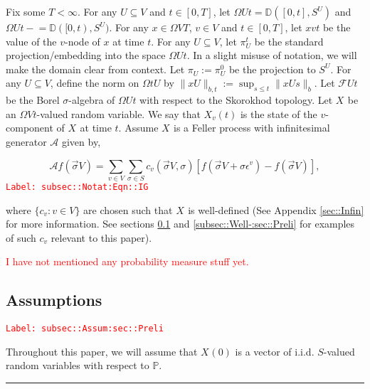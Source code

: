 \documentclass[12pt]{article}
\newcommand{\mb}{\mathbb}
\newcommand{\mc}{\mathcal}
\newcommand{\ep}{\epsilon}
\newcommand{\tr}{\textcolor{red}}
\newcommand{\labe}[1]{\tr{\texttt{Label: #1}}}
\newcommand{\ind}{\hspace{24pt}}
\newcommand{\lin}{\rule{\linewidth}{0.4 pt}}
\newcommand{\pr}{\mb{P}}							%
\newcommand{\defeq}{:=}								%
\newcommand{\cad}{\mb{D}}							%
\renewcommand{\v}{v}							%
\renewcommand{\U}{U}							%
\renewcommand{\S}{S}							%
\newcommand{\s}{\sigma}							%
\newcommand{\sv}{\vec{\s}}						%
\renewcommand{\b}{b}							%
\newcommand{\ev}[1]{\ep^{#1}}					%
\newcommand{\T}{T}								%
\newcommand{\x}{x}								%
\renewcommand{\t}{t}							%
\renewcommand{\tt}{s}							%
\newcommand{\F}{\mc{F}}							%
\newcommand{\IG}{\mc{A}}						%
\newcommand{\V}{V}									%
\newcommand{\XState}[1]{\S^{#1}}				%
\newcommand{\piV}[2]{\pi_{#1}^{#2}}					%
\newcommand{\rxvt}[2]{X_{#1}{(#2)}}					%
\newcommand{\rxvts}[2]{X_{#1}{#2}}					%
\newcommand{\IGr}[1]{c_{#1}}						%
\begin{document}
\ind Fix some \(\T < \infty\). For any \(\U\subseteq \V\) and \(\t\in [0,\T]\), let \(\Omega{\U}{\t} = \cad([0,\t],\S^{\U})\) and \(\Omega{\U}{\t-} = \cad([0,\t),\S^\U)\). For any \(\x{}{} \in \Omega{\V}{\T}\), \(\v\in \V\) and  \(\t \in [0,\T]\), let \(\x{\v}{\t}\) be the value of the \(\v\)-node of \(\x{}{}\) at time \(\t\). For any \(\U\subseteq \V\), let \(\piV{\U}{\t}\) be the standard projection/embedding into the space \(\Omega{\U}{\t}\). In a slight misuse of notation, we will make the domain clear from context. Let \(\piV{\U}{} \defeq \piV{\U}{0}\) be the projection to \(\S^\U\). For any \(\U\subseteq \V\), define the norm on \(\Omega{\t}{\U}\) by \(\|\x{\U}{}\|_{\b{},\t} \defeq \sup_{\tt \leq \t} \|\x{\U}{\tt}\|_{\b{}}\). Let \(\F{\U}{\t}\) be the Borel \(\sigma\)-algebra of \(\Omega{\U}{\t}\) with respect to the Skorokhod topology. Let \(\rxvts{}{}\) be an \(\Omega{\V}{\t}\)-valued random variable. We say that \(\rxvt{\v}{\t}\) is the state of the \(\v\)-component of \(\rxvts{}{}\) at time \(\t\). Assume \(\rxvts{}{}\) is a Feller process with infinitesimal generator \(\IG\) given by,

\begin{equation}
\IG f(\sv{}{\V}) = \sum_{\v \in \V}\sum_{\s \in \S} \IGr{\v}(\sv{}{\V},\s)[f(\sv{}{\V} + \s \ev{\v}) - f(\sv{}{\V})],
\label{subsec::Notat:Eqn::IG}
\end{equation}
\labe{subsec::Notat:Eqn::IG}

where \(\{\IGr{\v}:\v\in \V\}\) are chosen such that \(\rxvts{}{}\) is well-defined (See Appendix \ref{sec::Infin} for more information. See sections \ref{subsec::Assum:sec::Preli} and \ref{subsec::Well-:sec::Preli} for examples of such \(\IGr{\v}\) relevant to this paper). 

\tr{I have not mentioned any probability measure stuff yet.}

\subsection{Assumptions}
\label{subsec::Assum:sec::Preli}\labe{subsec::Assum:sec::Preli}

Throughout this paper, we will assume that \(\rxvt{}{0}\) is a vector of i.i.d. \(\S\)-valued random variables with respect to \(\pr\).

\lin
\end{document}
